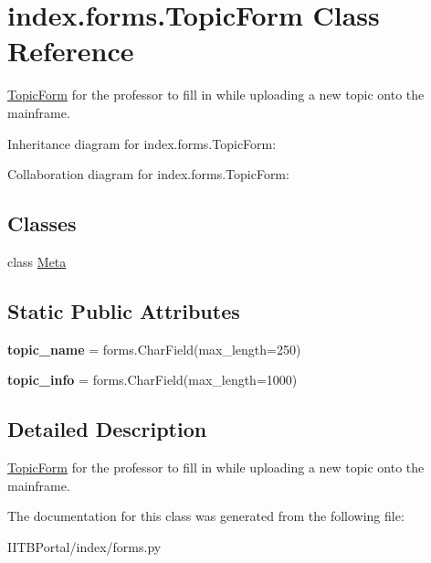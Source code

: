\hypertarget{classindex_1_1forms_1_1TopicForm}{}\section{index.\+forms.\+Topic\+Form Class Reference}
\label{classindex_1_1forms_1_1TopicForm}


\hyperlink{classindex_1_1forms_1_1TopicForm}{Topic\+Form} for the professor to fill in while uploading a new topic onto the mainframe.  




Inheritance diagram for index.\+forms.\+Topic\+Form\+:


Collaboration diagram for index.\+forms.\+Topic\+Form\+:
\subsection*{Classes}
\begin{DoxyCompactItemize}
\item 
class \hyperlink{classindex_1_1forms_1_1TopicForm_1_1Meta}{Meta}
\end{DoxyCompactItemize}
\subsection*{Static Public Attributes}
\begin{DoxyCompactItemize}
\item 
\mbox{\label{classindex_1_1forms_1_1TopicForm_a8daca49ee6c6d93674fab4881f07f65e}} 
{\bfseries topic\+\_\+name} = forms.\+Char\+Field(max\+\_\+length=250)
\item 
\mbox{\label{classindex_1_1forms_1_1TopicForm_a6a7079a5a63cef0ac8e7fc58349bab44}} 
{\bfseries topic\+\_\+info} = forms.\+Char\+Field(max\+\_\+length=1000)
\end{DoxyCompactItemize}


\subsection{Detailed Description}
\hyperlink{classindex_1_1forms_1_1TopicForm}{Topic\+Form} for the professor to fill in while uploading a new topic onto the mainframe. 



The documentation for this class was generated from the following file\+:\begin{DoxyCompactItemize}
\item 
I\+I\+T\+B\+Portal/index/forms.\+py\end{DoxyCompactItemize}
